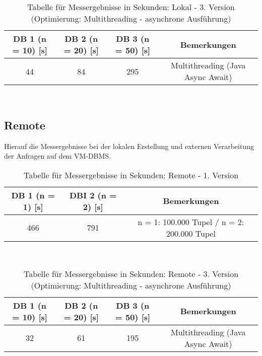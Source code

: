 \begin{table}[h!]
    \centering
    \begin{tabular}{|c|c|c|c|}
        \hline
        DB 1 (n = 10) [s] & DB 2 (n = 20) [s] & DB 3 (n = 50) [s] & Bemerkungen \\  \hline
        44 & 84 & 295 & Multithreading (Java Async Await)\\ \hline
    \end{tabular}
    \caption{Tabelle für Messergebnisse in Sekunden: Lokal - 3. Version (Optimierung: Multithreading - asynchrone Ausführung)}
    \label{tab:8}
\end{table} \\

\newpage
\subsection{Remote}\label{subsec:remote}
Hierauf die Messergebnisse bei der lokalen Erstellung und externen Verarbeitung der Anfragen auf dem VM-DBMS. \\
\begin{table}[h!]
    \centering
    \begin{tabular}{|c|c|c|}
        \hline
        DB 1 (n = 1) [s] & DBI 2 (n = 2) [s] & Bemerkungen \\  \hline
        466 & 791 & n = 1: 100.000 Tupel / n = 2: 200.000 Tupel\\ \hline
    \end{tabular}
    \caption{Tabelle für Messergebnisse in Sekunden: Remote - 1. Version}
    \label{tab:9}
\end{table} \\

\begin{table}[h!]
    \centering
    \begin{tabular}{|c|c|c|c|}
        \hline
        DB 1 (n = 10) [s] & DB 2 (n = 20) [s] & DB 3 (n = 50) [s] & Bemerkungen \\  \hline
        32 & 61 & 195 & Multithreading (Java Async Await)\\ \hline
    \end{tabular}
    \caption{Tabelle für Messergebnisse in Sekunden: Remote - 3. Version (Optimierung: Multithreading - asynchrone Ausführung)}
    \label{tab:10}
\end{table} \\